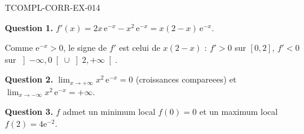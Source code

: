 \begin{corrige}{TCOMPL-CORR-EX-014}

\textbf{Question 1.} $f'(x) = 2x\,\mathrm{e}^{-x} - x^2\,\mathrm{e}^{-x} = x(2-x)\,\mathrm{e}^{-x}$.


Comme $\mathrm{e}^{-x} > 0$, le signe de $f'$ est celui de $x(2-x)$ :
$f' > 0$ sur $[0,2]$, $f' < 0$ sur $\left]-\infty,0\right[ \cup \left]2,+\infty\right[$.

\textbf{Question 2.} $\lim_{x \to +\infty} x^2\,\mathrm{e}^{-x} = 0$ (croissances compareees) et $\lim_{x \to -\infty} x^2\,\mathrm{e}^{-x} = +\infty$.

\textbf{Question 3.} $f$ admet un minimum local $f(0) = 0$ et un maximum local $f(2) = 4\mathrm{e}^{-2}$.

\end{corrige}
